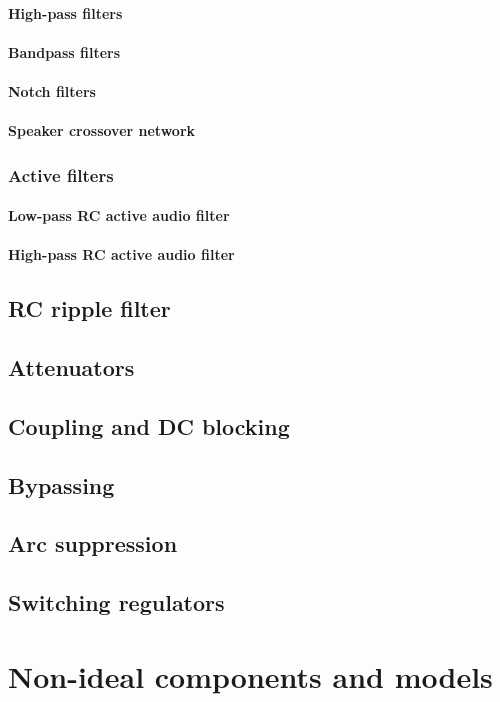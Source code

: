 \documentclass{report}
\begin{document}
\subsubsection{High-pass filters}
\subsubsection{Bandpass filters}
\subsubsection{Notch filters}
\subsubsection{Speaker crossover network}
\subsection{Active filters}
\subsubsection{Low-pass RC active audio filter}
\subsubsection{High-pass RC active audio filter}
\section{RC ripple filter}
\section{Attenuators}
\section{Coupling and DC blocking}
\section{Bypassing}
\section{Arc suppression}
\section{Switching regulators}


\chapter{Non-ideal components and models}
\end{document}
